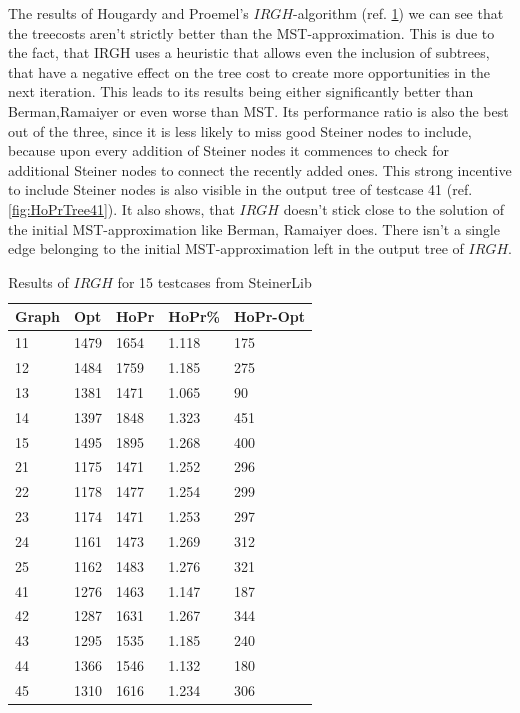 The results of Hougardy and Proemel's $IRGH$-algorithm (ref. \ref{tab:HoPrResults}) we can see that the treecosts aren't strictly better than the MST-approximation. This is due to the fact, that IRGH uses a heuristic that allows even the inclusion of subtrees, that have a negative effect on the tree cost to create more opportunities in the next iteration. This leads to its results being either significantly better than Berman,Ramaiyer or even worse than MST. Its performance ratio is also the best out of the three, since it is less likely to miss good Steiner nodes to include, because upon every addition of Steiner nodes it commences to check for additional Steiner nodes to connect the recently added ones. This strong incentive to include Steiner nodes is also visible in the output tree of testcase 41 (ref. \ref{fig:HoPrTree41}). It also shows, that $IRGH$ doesn't stick close to the solution of the initial MST-approximation like Berman, Ramaiyer does. There isn't a single edge belonging to the initial MST-approximation left in the output tree of $IRGH$.

\begin{table}[htbp]
 \caption{Results of $IRGH$ for 15 testcases from SteinerLib \cite{Dui93}}\label{tab:HoPrResults} 	
 \centering
 \begin{tabular}{l l l l l}
\toprule
Graph & Opt & HoPr & HoPr\% & HoPr-Opt \\
\midrule
11	& 1479	& 1654	& 1.118	& 175 \\
12	& 1484	& 1759	& 1.185	& 275 \\
13	& 1381	& 1471	& 1.065	& 90 	\\
14	& 1397	& 1848	& 1.323	& 451 \\
15	& 1495	& 1895	& 1.268	& 400 \\
\midrule 
21	& 1175	& 1471	& 1.252	& 296 \\
22	& 1178	& 1477	& 1.254	& 299 \\
23	& 1174	& 1471	& 1.253	& 297 \\
24	& 1161	& 1473	& 1.269 	& 312 \\
25	& 1162	& 1483	& 1.276	& 321 \\
\midrule
41	& 1276	& 1463	& 1.147	& 187 \\
42	& 1287	& 1631	& 1.267	& 344 \\
43	& 1295	& 1535	& 1.185	& 240 \\
44	& 1366	& 1546	& 1.132	& 180 \\
45	& 1310	& 1616	& 1.234	& 306 \\
\bottomrule
\end{tabular}
\end{table}

